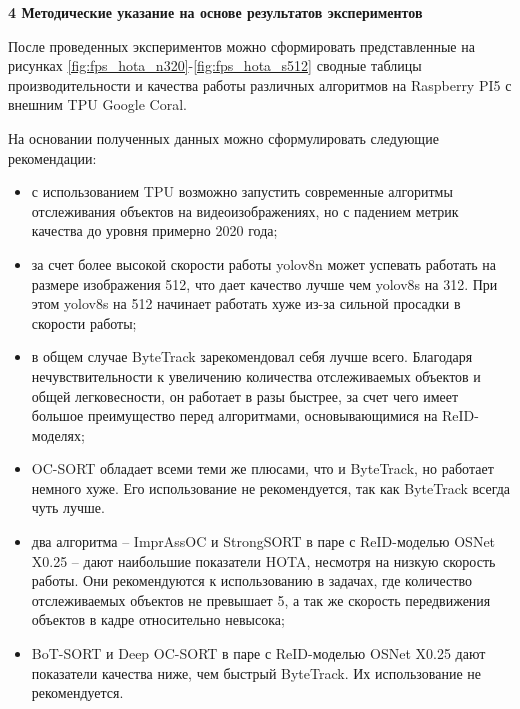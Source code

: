 \newpage
\begin{center}
  \textbf{\large 4 Методические указание на основе результатов экспериментов}
\end{center}
После проведенных экспериментов можно сформировать представленные на рисунках \ref{fig:fps_hota_n320}-\ref{fig:fps_hota_s512} сводные таблицы производительности и качества работы различных алгоритмов на Raspberry PI5 с внешним TPU Google Coral.

На основании полученных данных можно сформулировать следующие рекомендации:
\begin{itemize}
  \item с использованием TPU возможно запустить современные алгоритмы отслеживания объектов на видеоизображениях, но с падением метрик качества до уровня примерно 2020 года;
  \item за счет более высокой скорости работы yolov8n может успевать работать на размере изображения 512, что дает качество лучше чем yolov8s на 312. При этом yolov8s на 512 начинает работать хуже из-за сильной просадки в скорости работы;
  \item в общем случае ByteTrack зарекомендовал себя лучше всего. Благодаря нечувствительности к увеличению количества отслеживаемых объектов и общей легковесности, он работает в разы быстрее, за счет чего имеет большое преимущество перед алгоритмами, основывающимися на ReID-моделях; 
  \item OC-SORT обладает всеми теми же плюсами, что и ByteTrack, но работает немного хуже. Его использование не рекомендуется, так как ByteTrack всегда чуть лучше.
  \item два алгоритма -- ImprAssOC и StrongSORT в паре с ReID-моделью OSNet X0.25 -- дают наибольшие показатели HOTA, несмотря на низкую скорость работы. Они рекомендуются к использованию в задачах, где количество отслеживаемых объектов не превышает 5, а так же скорость передвижения объектов в кадре относительно невысока;
  \item BoT-SORT и Deep OC-SORT в паре с ReID-моделью OSNet X0.25 дают показатели качества ниже, чем быстрый ByteTrack. Их использование не рекомендуется.
\end{itemize}




